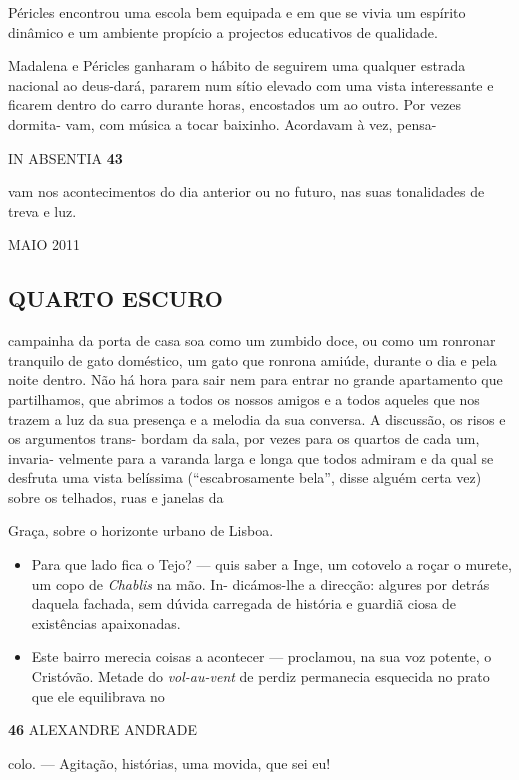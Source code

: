 Péricles encontrou uma escola bem equipada e em que se vivia um espírito
dinâmico e um ambiente propício a projectos educativos de qualidade.

Madalena e Péricles ganharam o hábito de seguirem uma qualquer estrada
nacional ao deus-dará, pararem num sítio elevado com uma vista
interessante e ficarem dentro do carro durante horas, encostados um ao
outro. Por vezes dormita- vam, com música a tocar baixinho. Acordavam à
vez, pensa-

IN ABSENTIA \textbf{43}

vam nos acontecimentos do dia anterior ou no futuro, nas suas
tonalidades de treva e luz.

MAIO 2011


\subsection{QUARTO ESCURO}

campainha da porta de casa soa como um zumbido doce, ou como um ronronar
tranquilo de gato doméstico, um gato que ronrona amiúde, durante o dia e
pela noite dentro. Não há hora para sair nem para entrar no grande
apartamento que partilhamos, que abrimos a todos os nossos amigos e a
todos aqueles que nos trazem a luz da sua presença e a melodia da sua
conversa. A discussão, os risos e os argumentos trans- bordam da sala,
por vezes para os quartos de cada um, invaria- velmente para a varanda
larga e longa que todos admiram e da qual se desfruta uma vista
belíssima (``escabrosamente bela'', disse alguém certa vez) sobre os
telhados, ruas e janelas da

Graça, sobre o horizonte urbano de Lisboa.

\begin{itemize}
\tightlist
\item
  Para que lado fica o Tejo? --- quis saber a Inge, um cotovelo a roçar
  o murete, um copo de \emph{Chablis }na mão. In- dicámos-lhe a
  direcção: algures por detrás daquela fachada, sem dúvida carregada de
  história e guardiã ciosa de existências apaixonadas.
\item
  Este bairro merecia coisas a acontecer --- proclamou, na sua voz
  potente, o Cristóvão. Metade do \emph{vol-au-vent }de perdiz
  permanecia esquecida no prato que ele equilibrava no
\end{itemize}

\textbf{46 }ALEXANDRE ANDRADE

colo. --- Agitação, histórias, uma movida, que sei eu!

